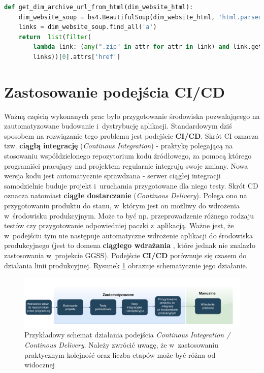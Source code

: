 \begin{lstlisting}[language=python, caption={Fragment skryptu \textit{dim\_download.py} odpowiedzialny za przetworzenie dokumentu HTML. Widoczne użycie elementów modułu \textit{BeautifulSoup4}.}, label={lst:bs4}]
def get_dim_archive_url_from_html(dim_website_html):
    dim_website_soup = bs4.BeautifulSoup(dim_website_html, 'html.parser')
    links = dim_website_soup.find_all('a')
    return  list(filter(
        lambda link: (any(".zip" in attr for attr in link) and link.getText().strip() == "dim.zip"), 
        links))[0].attrs['href']
\end{lstlisting}

\newpage

\section{Zastosowanie podejścia CI/CD}
Ważną częścią wykonanych prac było przygotowanie środowiska pozwalającego na zautomatyzowane budowanie i~dystrybucję aplikacji. Standardowym dziś sposobem na rozwiązanie tego problemu jest podejście \textbf{CI/CD}. Skrót CI oznacza tzw. \textbf{ciągłą integrację} (\textit{Continous Integration}) - praktykę polegającą na stosowaniu współdzielonego repozytorium kodu źródłowego, za pomocą którego programiści pracujący nad projektem regularnie integrują swoje zmiany. Nowa wersja kodu jest automatycznie sprawdzana - serwer ciągłej integracji samodzielnie buduje projekt i~uruchamia przygotowane dla niego testy. Skrót CD oznacza natomiast \textbf{ciągłe dostarczanie} (\textit{Continous Delivery}). Polega ono na przygotowaniu produktu do stanu, w~którym jest on możliwy do wdrożenia w~środowisku produkcyjnym. Może to być np. przeprowadzenie różnego rodzaju testów czy przygotowanie odpowiedniej paczki z~aplikacją. Ważne jest, że w~podejściu tym nie następuje automatyczne wdrożenie aplikacji do środowiska produkcyjnego (jest to domena \textbf{ciągłego wdrażania} \cite{CICDDef}, które jednak nie znalazło zastosowania w~projekcie GGSS). Podejście \textbf{CI/CD} porównuje się czasem do działania linii produkcyjnej. Rysunek \ref{fig:cicd} obrazuje schematycznie jego działanie. 

\begin{figure}[H]
\centering
\includegraphics[width=\textwidth]{res/CICD.pdf}
\caption{Przykładowy schemat działania podejścia \textit{Continous Integration / Continous Delivery}. Należy zwrócić uwagę, że w~zastosowaniu praktycznym kolejność oraz liczba etapów może być różna od widocznej}
\label{fig:cicd}
\end{figure}

